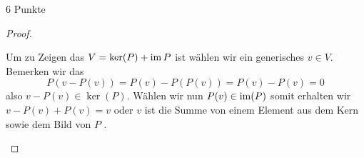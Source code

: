 \documentclass{problemset}
\begin{document}
\begin{problem}[Projektionen]{6 Punkte}
\begin{proof}
\begin{enumerate}
              Um zu Zeigen das $V = \ker(P) + \operatorname{im}{P}$ ist wählen wir ein
              generisches $v \in V$. Bemerken wir das \[
                  P(v - P(v)) = P(v) - P(P(v)) = P(v) - P(v) = 0
              \] also $v - P(v) \in \ker(P)$. Wählen wir nun $P(v) \in \operatorname{im}(P)$
                 somit erhalten wir $v - P(v) + P(v) = v$ oder $v$ ist die
                 Summe von einem Element aus dem Kern sowie dem Bild von $P$
                 \checkmark.

    \end{enumerate}
\end{proof}
\end{problem}
\end{document}
